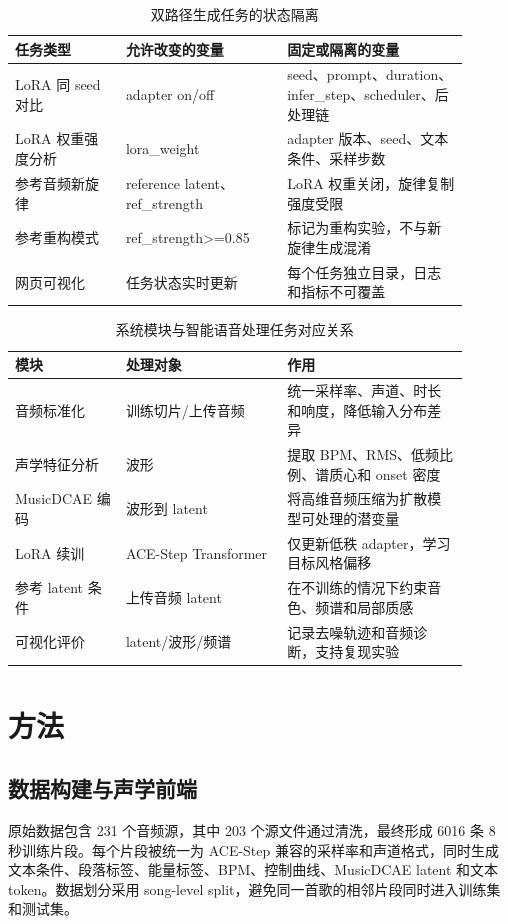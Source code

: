 \documentclass[UTF8,a4paper,zihao=-4,fontset=none]{ctexart}
\begin{document}
\begin{table}[H]
\centering
\caption{双路径生成任务的状态隔离}
\small
\begin{tabular}{p{0.22\linewidth}p{0.32\linewidth}p{0.36\linewidth}}
\toprule
任务类型 & 允许改变的变量 & 固定或隔离的变量 \\
\midrule
LoRA 同 seed 对比 & adapter on/off & seed、prompt、duration、infer\_step、scheduler、后处理链 \\
LoRA 权重强度分析 & lora\_weight & adapter 版本、seed、文本条件、采样步数 \\
参考音频新旋律 & reference latent、ref\_strength & LoRA 权重关闭，旋律复制强度受限 \\
参考重构模式 & ref\_strength>=0.85 & 标记为重构实验，不与新旋律生成混淆 \\
网页可视化 & 任务状态实时更新 & 每个任务独立目录，日志和指标不可覆盖 \\
\bottomrule
\end{tabular}
\end{table}
\begin{table}[H]
\centering
\caption{系统模块与智能语音处理任务对应关系}
\small
\begin{tabular}{p{0.22\linewidth}p{0.32\linewidth}p{0.36\linewidth}}
\toprule
模块 & 处理对象 & 作用 \\
\midrule
音频标准化 & 训练切片/上传音频 & 统一采样率、声道、时长和响度，降低输入分布差异 \\
声学特征分析 & 波形 & 提取 BPM、RMS、低频比例、谱质心和 onset 密度 \\
MusicDCAE 编码 & 波形到 latent & 将高维音频压缩为扩散模型可处理的潜变量 \\
LoRA 续训 & ACE-Step Transformer & 仅更新低秩 adapter，学习目标风格偏移 \\
参考 latent 条件 & 上传音频 latent & 在不训练的情况下约束音色、频谱和局部质感 \\
可视化评价 & latent/波形/频谱 & 记录去噪轨迹和音频诊断，支持复现实验 \\
\bottomrule
\end{tabular}
\end{table}
\section{方法}
\subsection{数据构建与声学前端}
原始数据包含 231 个音频源，其中 203 个源文件通过清洗，最终形成 6016 条 8 秒训练片段。每个片段被统一为 ACE-Step 兼容的采样率和声道格式，同时生成文本条件、段落标签、能量标签、BPM、控制曲线、MusicDCAE latent 和文本 token。数据划分采用 song-level split，避免同一首歌的相邻片段同时进入训练集和测试集。
\end{document}
